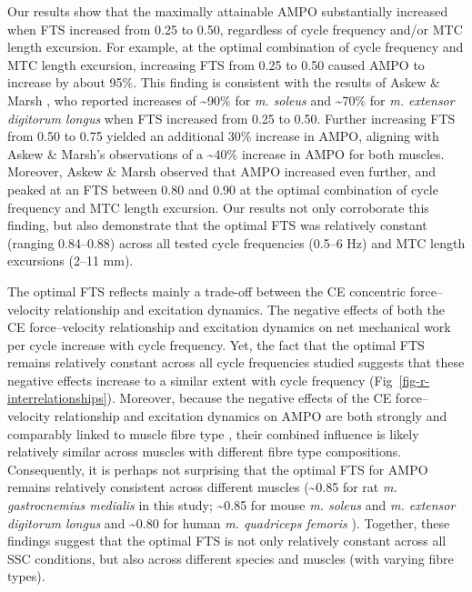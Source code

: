 \documentclass[
  10pt,
  letterpaper,
]{article}
\begin{document}
Our results show that the maximally attainable AMPO substantially
increased when FTS increased from 0.25 to 0.50, regardless of cycle
frequency and/or MTC length excursion. For example, at the optimal
combination of cycle frequency and MTC length excursion, increasing FTS
from 0.25 to 0.50 caused AMPO to increase by about 95\%. This finding is
consistent with the results of {Askew \& Marsh
\citep{askew_effects_1997}}, who reported increases of
\textasciitilde90\% for \emph{m. soleus} and \textasciitilde70\% for
\emph{m. extensor digitorum longus} when FTS increased from 0.25 to
0.50. Further increasing FTS from 0.50 to 0.75 yielded an additional
30\% increase in AMPO, aligning with Askew \& Marsh's observations of a
\textasciitilde40\% increase in AMPO for both muscles. Moreover, {Askew
\& Marsh \citep{askew_effects_1997}} observed that AMPO increased even
further, and peaked at an FTS between 0.80 and 0.90 at the optimal
combination of cycle frequency and MTC length excursion. Our results not
only corroborate this finding, but also demonstrate that the optimal FTS
was relatively constant (ranging 0.84--0.88) across all tested cycle
frequencies (0.5--6 Hz) and MTC length excursions (2--11 mm).

The optimal FTS reflects mainly a trade-off between the CE concentric
force--velocity relationship and excitation dynamics. The negative
effects of both the CE force--velocity relationship and excitation
dynamics on net mechanical work per cycle increase with cycle frequency.
Yet, the fact that the optimal FTS remains relatively constant across
all cycle frequencies studied suggests that these negative effects
increase to a similar extent with cycle frequency
(Fig~\ref{fig-r-interrelationships}). Moreover, because the negative
effects of the CE force--velocity relationship and excitation dynamics
on AMPO are both strongly and comparably linked to muscle fibre type
\citep{close_dynamic_1972}, their combined influence is likely
relatively similar across muscles with different fibre type
compositions. Consequently, it is perhaps not surprising that the
optimal FTS for AMPO remains relatively consistent across different
muscles (\textasciitilde0.85 for rat \emph{m. gastrocnemius medialis} in
this study; \textasciitilde0.85 for mouse \emph{m. soleus} and \emph{m.
extensor digitorum longus} \citep[see][]{askew_effects_1997} and
\textasciitilde0.80 for human \emph{m. quadriceps femoris}
\citep[see][]{reuvers_what_2026}). Together, these findings suggest that
the optimal FTS is not only relatively constant across all SSC
conditions, but also across different species and muscles (with varying
fibre types).
\end{document}

